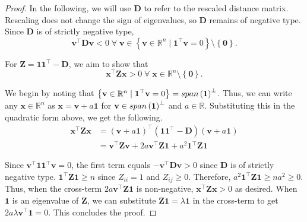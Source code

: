 \documentclass[10pt,a4paper]{amsart}
\renewcommand{\vec}[1]{\mathbf{#1}}
\begin{document}
\begin{proof}
In the following, we will use $\vec{D}$ to refer to the rescaled distance matrix. Rescaling does not change the sign of eigenvalues, so $\vec{D}$ remains of negative type. Since $\vec{D}$ is of strictly negative type,
\begin{equation}
    \vec{v}^\top \vec{Dv} < 0 \; \forall \; \vec{v} \in \left\{ \vec{v} \in \mathbb{R}^n \mid \vec{1}^\top\vec{v}=0 \right\} \setminus \left\{ \vec{0}\right\}.
\end{equation}

For $\vec{Z}=\vec{11}^\top - \vec{D}$, we aim to show that
\begin{equation}
    \vec{x}^\top \vec{Zx} > 0 \; \forall\; \vec{x} \in \mathbb{R}^n \setminus \left\{\vec{0}\right\}.
\end{equation}

We begin by noting that $\left\{ \vec{v} \in \mathbb{R}^n \mid \vec{1}^\top\vec{v}=0 \right\} = \textnormal{span}\left(\vec{1}\right)^\perp$. Thus, we can write any $\vec{x}\in\mathbb{R}^n$ as $\vec{x}=\vec{v} + a\vec{1}$ for $\vec{v}\in\textnormal{span}\left(\vec{1}\right)^\perp$ and $a\in\mathbb{R}$. Substituting this in the quadratic form above, we get the following.
\begin{align*}
    \vec{x}^\top \vec{Zx} &= \left( \vec{v} + a\vec{1}\right)^\top \left( \vec{11}^\top - \vec{D} \right) \left( \vec{v} + a\vec{1} \right)\\
    &= \vec{v}^\top \vec{Z} \vec{v} + 2a \vec{v}^\top\vec{Z} \vec{1} + a^2\vec{1}^\top \vec{Z} \vec{1}
\end{align*}

Since $\vec{v}^\top \vec{11}^\top \vec{v}=0$, the first term equals $-\vec{v}^\top \vec{D} \vec{v} > 0$ since $\vec{D}$ is of strictly negative type. $\vec{1}^\top \vec{Z} \vec{1} \geq n$ since $Z_{ii}=1$ and $Z_{ij}\geq 0$. Therefore, $a^2\vec{1}^\top \vec{Z} \vec{1} \geq na^2 \geq 0$. Thus, when the cross-term $2a \vec{v}^\top\vec{Z} \vec{1}$ is non-negative, $\vec{x}^\top \vec{Zx} > 0$ as desired. When $\vec{1}$ is an eigenvalue of $\vec{Z}$, we can substitute $\vec{Z1}=\lambda \vec{1}$ in the cross-term to get $2a\lambda \vec{v}^\top\vec{1} = 0$. This concludes the proof.
\end{proof}
\end{document}
